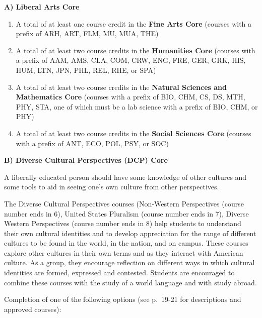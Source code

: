 \documentclass[
  letterpaper,
]{scrbook}
\providecommand{\tightlist}{%
  \setlength{\itemsep}{0pt}\setlength{\parskip}{0pt}}
\begin{document}
\textbf{A) Liberal Arts Core}

\begin{enumerate}
\def\labelenumi{\arabic{enumi}.}
\tightlist
\item
  A total of at least one course credit in the \textbf{Fine Arts Core}
  (courses with a prefix of ARH, ART, FLM, MU, MUA, THE)
\item
  A total of at least two course credits in the \textbf{Humanities Core}
  (courses with a prefix of AAM, AMS, CLA, COM, CRW, ENG, FRE, GER, GRK,
  HIS, HUM, LTN, JPN, PHL, REL, RHE, or SPA)
\item
  A total of at least two course credits in the \textbf{Natural Sciences
  and Mathematics Core} (courses with a prefix of BIO, CHM, CS, DS, MTH,
  PHY, STA, one of which must be a lab science with a prefix of BIO,
  CHM, or PHY)
\item
  A total of at least two course credits in the \textbf{Social Sciences
  Core} (courses with a prefix of ANT, ECO, POL, PSY, or SOC)
\end{enumerate}

\textbf{B) Diverse Cultural Perspectives (DCP) Core}

A liberally educated person should have some knowledge of other cultures
and some tools to aid in seeing one's own culture from other
perspectives.

The Diverse Cultural Perspectives courses (Non-Western Perspectives
(course number ends in 6), United States Pluralism (course number ends
in 7), Diverse Western Perspectives (course number ends in 8) help
students to understand their own cultural identities and to develop
appreciation for the range of different cultures to be found in the
world, in the nation, and on campus. These courses explore other
cultures in their own terms and as they interact with American culture.
As a group, they encourage reflection on different ways in which
cultural identities are formed, expressed and contested. Students are
encouraged to combine these courses with the study of a world language
and with study abroad.

Completion of one of the following options (see p.~19-21 for
descriptions and approved courses):
\end{document}
